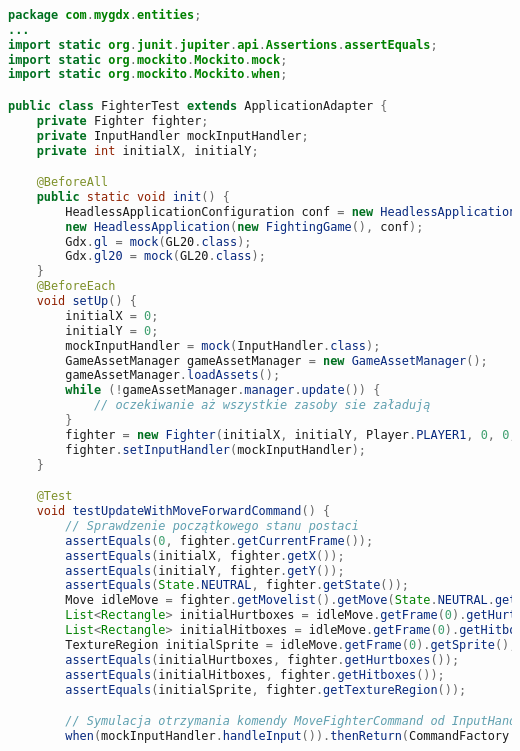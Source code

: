 \begin{lstlisting}[language=Java,style=JavaStyle,label=list:FighterTest,caption=Test metody \texttt{update} z klasy \texttt{Fighter},
                   basicstyle=\footnotesize\ttfamily]
							
package com.mygdx.entities;
...
import static org.junit.jupiter.api.Assertions.assertEquals;
import static org.mockito.Mockito.mock;
import static org.mockito.Mockito.when;

public class FighterTest extends ApplicationAdapter {
    private Fighter fighter;
    private InputHandler mockInputHandler;
    private int initialX, initialY;

    @BeforeAll
    public static void init() {
        HeadlessApplicationConfiguration conf = new HeadlessApplicationConfiguration();
        new HeadlessApplication(new FightingGame(), conf);
        Gdx.gl = mock(GL20.class);
        Gdx.gl20 = mock(GL20.class);
    }
    @BeforeEach
    void setUp() {
        initialX = 0;
        initialY = 0;
        mockInputHandler = mock(InputHandler.class);
        GameAssetManager gameAssetManager = new GameAssetManager();
        gameAssetManager.loadAssets();
        while (!gameAssetManager.manager.update()) {
            // oczekiwanie aż wszystkie zasoby sie załadują
        }
        fighter = new Fighter(initialX, initialY, Player.PLAYER1, 0, 0, 0, 0, 10, gameAssetManager.manager);
        fighter.setInputHandler(mockInputHandler);
    }

    @Test
    void testUpdateWithMoveForwardCommand() {
        // Sprawdzenie początkowego stanu postaci
        assertEquals(0, fighter.getCurrentFrame());
        assertEquals(initialX, fighter.getX());
        assertEquals(initialY, fighter.getY());
        assertEquals(State.NEUTRAL, fighter.getState());
        Move idleMove = fighter.getMovelist().getMove(State.NEUTRAL.getId());
        List<Rectangle> initialHurtboxes = idleMove.getFrame(0).getHurtboxes();
        List<Rectangle> initialHitboxes = idleMove.getFrame(0).getHitboxes();
        TextureRegion initialSprite = idleMove.getFrame(0).getSprite();
        assertEquals(initialHurtboxes, fighter.getHurtboxes());
        assertEquals(initialHitboxes, fighter.getHitboxes());
        assertEquals(initialSprite, fighter.getTextureRegion());

        // Symulacja otrzymania komendy MoveFighterCommand od InputHandler'a
        when(mockInputHandler.handleInput()).thenReturn(CommandFactory.moveFighterCommandForward(fighter));


\end{lstlisting}
